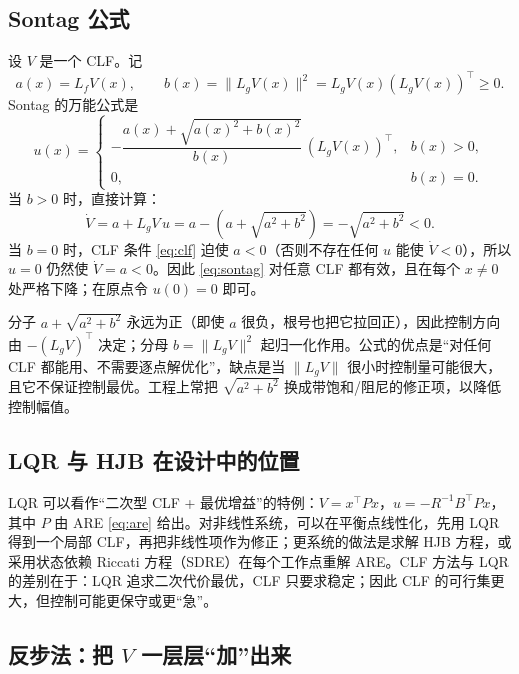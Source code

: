 \documentclass[11pt, a4paper, UTF8, fontset=none]{ctexart}
\theoremstyle{cnthm}
\newcommand{\norm}[1]{\lVert #1\rVert}
\newcommand{\Lf}{L_f}
\newcommand{\Lg}{L_g}
\begin{document}
\subsection{Sontag 公式}

设 $V$ 是一个 CLF。记
\begin{equation}
  a(x)=\Lf V(x),\qquad b(x)=\norm{\Lg V(x)}^2=\Lg V(x)(\Lg V(x))^\top\ge0.
\end{equation}
Sontag 的万能公式是
\begin{equation}
  u(x)=
  \begin{cases}
    -\dfrac{a(x)+\sqrt{a(x)^2+b(x)^2}}{b(x)}\,(\Lg V(x))^\top, & b(x)>0,\\[8pt]
    0, & b(x)=0.
  \end{cases}
  \label{eq:sontag}
\end{equation}
当 $b>0$ 时，直接计算：
\begin{equation}
  \dot V=a+\Lg V\,u
  =a-\left(a+\sqrt{a^2+b^2}\right)
  =-\sqrt{a^2+b^2}<0.
\end{equation}
当 $b=0$ 时，CLF 条件 \eqref{eq:clf} 迫使 $a<0$（否则不存在任何 $u$ 能使 $\dot V<0$），所以 $u=0$ 仍然使 $\dot V=a<0$。因此 \eqref{eq:sontag} 对任意 CLF 都有效，且在每个 $x\ne0$ 处严格下降；在原点令 $u(0)=0$ 即可。

\begin{keybox}
分子 $a+\sqrt{a^2+b^2}$ 永远为正（即使 $a$ 很负，根号也把它拉回正），因此控制方向由 $-(\Lg V)^\top$ 决定；分母 $b=\norm{\Lg V}^2$ 起归一化作用。公式的优点是“对任何 CLF 都能用、不需要逐点解优化”，缺点是当 $\norm{\Lg V}$ 很小时控制量可能很大，且它不保证控制最优。工程上常把 $\sqrt{a^2+b^2}$ 换成带饱和/阻尼的修正项，以降低控制幅值。
\end{keybox}

\subsection{LQR 与 HJB 在设计中的位置}

LQR 可以看作“二次型 CLF + 最优增益”的特例：$V=x^\top Px$，$u=-R^{-1}B^\top Px$，其中 $P$ 由 ARE \eqref{eq:are} 给出。对非线性系统，可以在平衡点线性化，先用 LQR 得到一个局部 CLF，再把非线性项作为修正；更系统的做法是求解 HJB 方程，或采用状态依赖 Riccati 方程（SDRE）在每个工作点重解 ARE。CLF 方法与 LQR 的差别在于：LQR 追求二次代价最优，CLF 只要求稳定；因此 CLF 的可行集更大，但控制可能更保守或更“急”。

\subsection{反步法：把 \texorpdfstring{$V$}{V} 一层层“加”出来}
\end{document}
